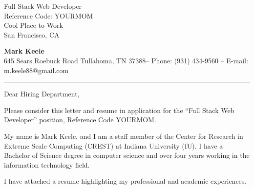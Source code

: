 \documentclass[11pt,letterpaper]{letter}
\begin{document}
\begin{letter}{
Full Stack Web Developer \\
Reference Code: YOURMOM\\
Cool Place to Work\\
San Francisco, CA
}

\begin{flushleft}
{\Large\bf Mark Keele}\\
{\small 645 Sears Roebuck Road Tullahoma, TN 37388-- Phone: (931) 434-9560 -- E-mail: m.keele88@gmail.com}
\vskip 1.5pt
\hrule height 0.4pt
\end{flushleft}

\opening{ Dear Hiring Department, }

\noindent Please consider this letter and resume in application for the
``Full Stack Web Developer'' position, Reference Code YOURMOM.

\noindent My name is Mark Keele, and I am a staff member of the Center for Research in Extreme Scale Computing (CREST) at Indiana University (IU). I
have a Bachelor of Science degree in computer science and over four years
working in the information technology field.

I have attached a resume highlighting my professional and academic experiences.




\end{letter}
\end{document}
